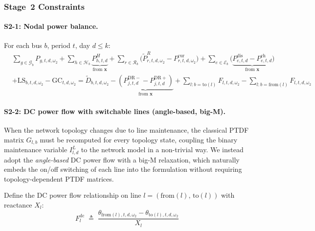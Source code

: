 \documentclass[11pt]{article}
\newcommand{\Pch}{P^{\mathrm{ch}}}
\newcommand{\Pdis}{P^{\mathrm{dis}}}
\newcommand{\LS}{\mathrm{LS}}
\newcommand{\GC}{\mathrm{GC}}
\begin{document}
\subsubsection{Stage~2 Constraints}

\paragraph{S2-1: Nodal power balance.}
For each bus $b$, period $t$, day $d \leq k$:
\begin{equation}\label{eq:s2-balance}
\begin{aligned}
  & \sum_{g \in \mathcal{G}_b} P_{g,t,d,\omega_2}
  + \sum_{h \in \mathcal{H}_b}
    \underbrace{P^{H}_{h,t,d}}_{\text{from } \mathbf{x}}
  + \sum_{r \in \mathcal{R}_b}
    \bigl(\tilde{P}^{R}_{r,t,d,\omega_2}
    - P^{\mathrm{cur}}_{r,t,d,\omega_2}\bigr)
  + \sum_{e \in \mathcal{E}_b}
    \bigl(
    \underbrace{\Pdis_{e,t,d} - \Pch_{e,t,d}}_{\text{from } \mathbf{x}}
    \bigr) \\
  &+ \LS_{b,t,d,\omega_2} - \GC_{t,d,\omega_2}
  = \tilde{D}_{b,t,d,\omega_2}
  - \underbrace{
    (P^{\mathrm{DR-}}_{j,t,d} - P^{\mathrm{DR+}}_{j,t,d})
  }_{\text{from } \mathbf{x}}
  + \!\!\sum_{l: b=\mathrm{to}(l)}\!\! F_{l,t,d,\omega_2}
  - \!\!\sum_{l: b=\mathrm{from}(l)}\!\! F_{l,t,d,\omega_2}
\end{aligned}
\end{equation}

\paragraph{S2-2: DC power flow with switchable lines (angle-based, big-M).}

When the network topology changes due to line maintenance, the
classical PTDF matrix $G_{l,b}$ must be recomputed for every topology
state, coupling the binary maintenance variable $I^{L}_{l,d}$ to the
network model in a non-trivial way.  We instead adopt the
\emph{angle-based} DC power flow with a big-M relaxation, which
naturally embeds the on/off switching of each line into the
formulation without requiring topology-dependent PTDF matrices.

Define the DC power flow relationship on line
$l = (\mathrm{from}(l),\,\mathrm{to}(l))$ with reactance $X_l$:
\begin{equation}\label{eq:s2-dcpf-def}
  F^{\mathrm{dc}}_{l} \;\triangleq\;
  \frac{\theta_{\mathrm{from}(l),t,d,\omega_2}
  - \theta_{\mathrm{to}(l),t,d,\omega_2}}{X_l}
\end{equation}
\end{document}
